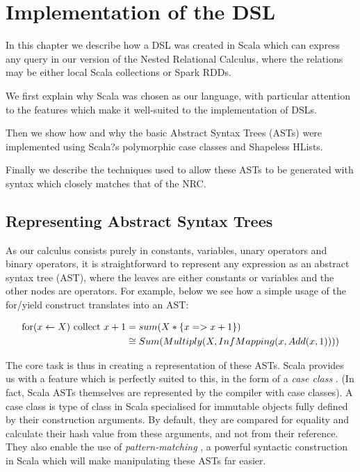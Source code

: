 \chapter{Implementation of the DSL}

In this chapter we describe how a DSL was created in Scala which can express any query in our version of the Nested Relational Calculus, where the relations may be either local Scala collections or Spark RDDs.

We first explain why Scala was chosen as our language, with particular attention to the features which make it well-suited to the implementation of DSLs.

Then we show how and why the basic Abstract Syntax Trees (ASTs) were implemented using Scala?s polymorphic case classes and Shapeless HLists.

Finally we describe the techniques used to allow these ASTs to be generated with syntax which closely matches that of the NRC.

\section{Representing Abstract Syntax Trees}

As our calculus consists purely in constants, variables, unary operators and binary operators, it is straightforward to represent any expression as an abstract syntax tree (AST), where the leaves are either constants or variables and the other nodes are operators. For example, below we see how a simple usage of the for/yield construct translates into an AST:

\begin{equation*}
\begin{split}
\textrm{for}(x \leftarrow X) \textrm{ collect } x + 1 &= sum(X*\{x => x + 1\}) \\
&\cong Sum(Multiply(X,InfMapping(x,Add(x,1))))
\end{split}
\end{equation*}

The core task is thus in creating a representation of these ASTs. Scala provides us with a feature which is perfectly suited to this, in the form of a \textit{case class} \cite{caseclass}. (In fact, Scala ASTs themselves are represented by the compiler with case classes\cite{compilerasts}). A case class is type of class in Scala specialised for immutable objects fully defined by their construction arguments. By default, they are compared for equality and calculate their hash value from these arguments, and not from their reference. They also enable the use of \textit{pattern-matching} \cite{patternmatch}, a powerful syntactic construction in Scala which will make manipulating these ASTs far easier.

